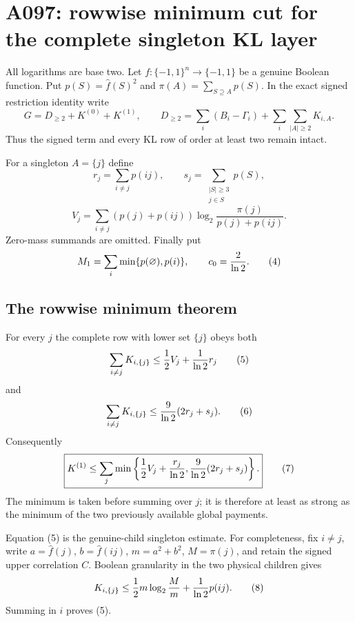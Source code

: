 \section*{A097: rowwise minimum cut for the complete singleton KL layer}

All logarithms are base two.  Let $f:\{-1,1\}^n\to\{-1,1\}$ be a
genuine Boolean function.  Put $p(S)=\widehat f(S)^2$ and
$\pi(A)=\sum_{S\supseteq A}p(S)$.  In the exact signed restriction identity
write
\[
 G=D_{\ge2}+K^{(0)}+K^{(1)},\qquad
 D_{\ge2}=\sum_i(B_i-\Gamma_i)+\sum_i\sum_{|A|\ge2}K_{i,A}.       \tag{1}
\]
Thus the signed term and every KL row of order at least two remain intact.

For a singleton $A=\{j\}$ define
\[
 r_j=\sum_{i\ne j}p(ij),\qquad
 s_j=\sum_{\substack{|S|\ge3\\j\in S}}p(S),                    \tag{2}
\]
\[
 V_j=\sum_{i\ne j}(p(j)+p(ij))
 \log_2\frac{\pi(j)}{p(j)+p(ij)}.                               \tag{3}
\]
Zero-mass summands are omitted.  Finally put
\[
 M_1=\sum_i\min\{p(\varnothing),p(i)\},\qquad c_0={2\over\ln2}. \tag{4}
\]

\subsection*{The rowwise minimum theorem}

For every $j$ the complete row with lower set $\{j\}$ obeys both
\[
 \sum_{i\ne j}K_{i,\{j\}}
 \le {1\over2}V_j+{1\over\ln2}r_j                               \tag{5}
\]
and
\[
 \sum_{i\ne j}K_{i,\{j\}}
 \le {9\over\ln2}(2r_j+s_j).                                   \tag{6}
\]
Consequently
\[
 \boxed{
 K^{(1)}\le\sum_j\min\left\{
 {1\over2}V_j+{r_j\over\ln2},
 {9\over\ln2}(2r_j+s_j)\right\}.}                              \tag{7}
\]
The minimum is taken before summing over $j$; it is therefore at least as
strong as the minimum of the two previously available global payments.

Equation (5) is the genuine-child singleton estimate.  For completeness,
fix $i\ne j$, write $a=\widehat f(j)$, $b=\widehat f(ij)$,
$m=a^2+b^2$, $M=\pi(j)$, and retain the signed upper correlation $C$.
Boolean granularity in the two physical children gives
\[
 K_{i,\{j\}}\le {1\over2}m\log_2{M\over m}
                   +{1\over\ln2}p(ij).                          \tag{8}
\]
Summing in $i$ proves (5).


